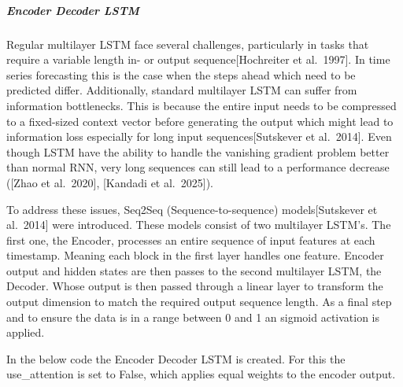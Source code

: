 \documentclass[a4paper]{article}
\begin{document}
    \subparagraph{Encoder Decoder LSTM}\label{encoder-decoder-lstm}

    Regular multilayer LSTM face several challenges, particularly in tasks
that require a variable length in- or output sequence{[}Hochreiter et
al.~1997{]}. In time series forecasting this is the case when the steps
ahead which need to be predicted differ. Additionally, standard
multilayer LSTM can suffer from information bottlenecks. This is because
the entire input needs to be compressed to a fixed-sized context vector
before generating the output which might lead to information loss
especially for long input sequences{[}Sutskever et al.~2014{]}. Even
though LSTM have the ability to handle the vanishing gradient problem
better than normal RNN, very long sequences can still lead to a
performance decrease ({[}Zhao et al.~2020{]}, {[}Kandadi et
al.~2025{]}).

To address these issues, Seq2Seq (Sequence-to-sequence)
models{[}Sutskever et al.~2014{]} were introduced. These models consist
of two multilayer LSTM's. The first one, the Encoder, processes an
entire sequence of input features at each timestamp. Meaning each block
in the first layer handles one feature. Encoder output and hidden states
are then passes to the second multilayer LSTM, the Decoder. Whose output
is then passed through a linear layer to transform the output dimension
to match the required output sequence length. As a final step and to
ensure the data is in a range between 0 and 1 an sigmoid activation is
applied.

In the below code the Encoder Decoder LSTM is created. For this the
use\_attention is set to False, which applies equal weights to the
encoder output.
\end{document}
